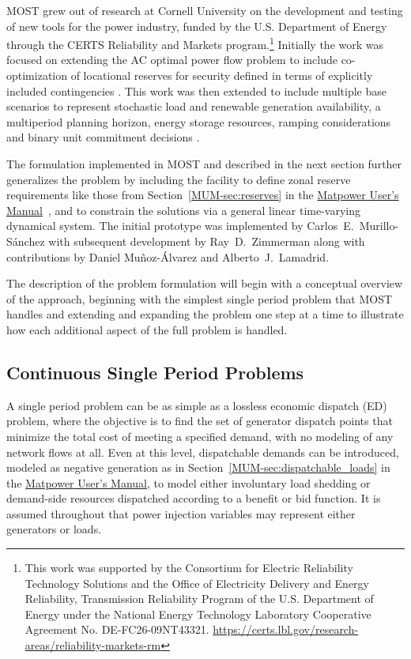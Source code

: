 \documentclass[12pt]{article}
\newcommand{\mpver}[0]{8.1}
\newcommand{\matpower}[0]{{\sc Matpower}}
\newcommand{\most}[0]{{MOST}}
\newcommand{\mumurl}[0]{https://matpower.org/docs/MATPOWER-manual-\mpver.pdf}
\newcommand{\mum}[0]{\href{\mumurl}{\matpower{} User's Manual}}
\numberwithin{equation}{section}
\numberwithin{table}{section}
\numberwithin{figure}{section}
\begin{document}
\most{} grew out of research at Cornell University on the development and testing of new tools for the power industry, funded by the U.S. Department of Energy through the CERTS Reliability and Markets program.\footnote{This work was supported by the Consortium for Electric Reliability Technology Solutions and the Office of Electricity Delivery and Energy Reliability, Transmission Reliability Program of the U.S. Department of Energy under the National Energy Technology Laboratory Cooperative Agreement No. DE-FC26-09NT43321. \url{https://certs.lbl.gov/research-areas/reliability-markets-rm}} Initially the work was focused on extending the AC optimal power flow problem to include co-optimization of locational reserves for security defined in terms of explicitly included contingencies \cite{superopf2008,murillo-sanchez2013}. This work was then extended to include multiple base scenarios to represent stochastic load and renewable generation availability, a multiperiod planning horizon, energy storage resources, ramping considerations and binary unit commitment decisions \cite{murillo-sanchez2013a}.

The formulation implemented in \most{} and described in the next section further generalizes the problem by including the facility to define zonal reserve requirements like those from Section~\ref{MUM-sec:reserves} in the \mum{}~\cite{matpower_manual}, and to constrain the solutions via a general linear time-varying dynamical system. The initial prototype was implemented by Carlos~E.~Murillo-S\'anchez with subsequent development by Ray~D.~Zimmerman along with contributions by Daniel Mu\~noz-\'Alvarez and Alberto~J.~Lamadrid.

The description of the problem formulation will begin with a conceptual overview of the approach, beginning with the simplest single period problem that \most{} handles and extending and expanding the problem one step at a time to illustrate how each additional aspect of the full problem is handled.

\subsection{Continuous Single Period Problems}

A single period problem can be as simple as a lossless economic dispatch (ED) problem, where the objective is to find the set of generator dispatch points that minimize the total cost of meeting a specified demand, with no modeling of any network flows at all. Even at this level, dispatchable demands can be introduced, modeled as negative generation as in Section~\ref{MUM-sec:dispatchable_loads} in the \mum{}, to model either involuntary load shedding or demand-side resources dispatched according to a benefit or bid function. It is assumed throughout that power injection variables may represent either generators or loads.
\end{document}
